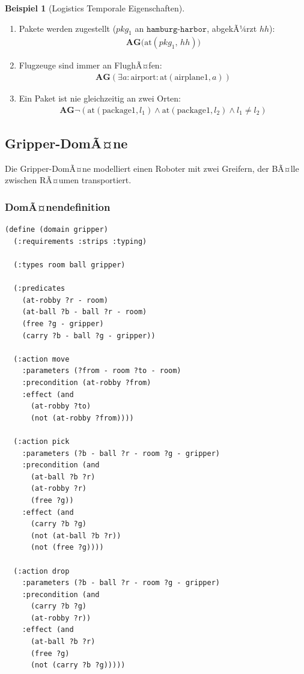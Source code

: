 ﻿\documentclass[a4paper,12pt]{article}
\theoremstyle{definition}
\newtheorem{beispiel}{Beispiel}[section]
\begin{document}
\begin{beispiel}[Logistics Temporale Eigenschaften]
	\begin{enumerate}
		\item Pakete werden zugestellt
		($\mathit{pkg}_1$ an $\texttt{hamburg-harbor}$, abgekÃ¼rzt $\mathit{hh}$):
		\begin{align}
		\mathbf{AG}\bigl(\mathrm{at}(\mathit{pkg}_1,\,\mathit{hh})\bigr)
		\end{align}
		
		\item Flugzeuge sind immer an FlughÃ¤fen:
		\begin{align}
		\mathbf{AG}(\exists a: \text{airport}: \text{at}(\text{airplane1}, a))
		\end{align}
		
		\item Ein Paket ist nie gleichzeitig an zwei Orten:
		\begin{align}
		\mathbf{AG}\neg(\text{at}(\text{package1}, l_1) \land \text{at}(\text{package1}, l_2) \land l_1 \neq l_2)
		\end{align}
	\end{enumerate}
\end{beispiel}

\subsection{Gripper-DomÃ¤ne}

Die Gripper-DomÃ¤ne modelliert einen Roboter mit zwei Greifern, der BÃ¤lle zwischen RÃ¤umen transportiert.

\subsubsection{DomÃ¤nendefinition}

\begin{lstlisting}[language=PDDL, caption=Gripper DomÃ¤ne]
(define (domain gripper)
  (:requirements :strips :typing)
  
  (:types room ball gripper)
  
  (:predicates
    (at-robby ?r - room)
    (at-ball ?b - ball ?r - room)
    (free ?g - gripper)
    (carry ?b - ball ?g - gripper))
  
  (:action move
    :parameters (?from - room ?to - room)
    :precondition (at-robby ?from)
    :effect (and
      (at-robby ?to)
      (not (at-robby ?from))))
  
  (:action pick
    :parameters (?b - ball ?r - room ?g - gripper)
    :precondition (and
      (at-ball ?b ?r)
      (at-robby ?r)
      (free ?g))
    :effect (and
      (carry ?b ?g)
      (not (at-ball ?b ?r))
      (not (free ?g))))
  
  (:action drop
    :parameters (?b - ball ?r - room ?g - gripper)
    :precondition (and
      (carry ?b ?g)
      (at-robby ?r))
    :effect (and
      (at-ball ?b ?r)
      (free ?g)
      (not (carry ?b ?g)))))
\end{lstlisting}
\end{document}
